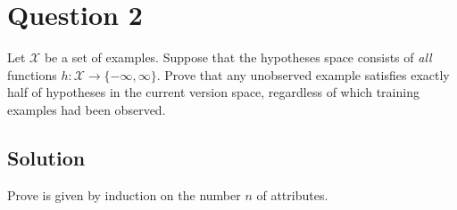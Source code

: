 
\section*{Question 2}

Let $\mathcal{X}$ be a set of examples.
Suppose that the hypotheses space consists of \textit{all} functions $h : \mathcal{X} \longrightarrow \{-\infty, \infty \}$.
Prove that any unobserved example satisfies exactly half of hypotheses in the current version space, regardless of which training examples had been observed.

\subsection*{Solution}

Prove is given by induction on the number $n$ of attributes.

